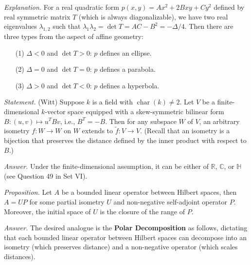 \documentclass{mathproblems}
\newcommand\R{\mathbb{R}}
\newcommand\C{\mathbb{C}}
\begin{document}
\begin{questions}
\textit{Explanation.} For a real quadratic form $p(x,y)=Ax^2+2Bxy+Cy^2$ defined by real symmetric matrix $T$ (which is always diagonalizable), we have two real eigenvalues $\lambda_{1,2}$ such that $\lambda_1\lambda_2=\det T=AC-B^2=-\Delta/4$. Then there are three types from the aspect of affine geometry: \vspace{-6pt}
\begin{itemize}
\item[(1)] $\Delta<0$ and $\det T>0$: $p$ defines an ellipse. \vspace{-4pt}

\item[(2)] $\Delta=0$ and $\det T=0$: $p$ defines a parabola. \vspace{-4pt}

\item[(3)] $\Delta>0$ and $\det T<0$: $p$ defines a hyperbola.
\end{itemize}



\textit{Statement.} (Witt) Suppose $k$ is a field with $\operatorname{char}(k)\neq 2$. Let $V$ be a finite-dimensional $k$-vector space equipped with a skew-symmetric bilinear form $B:(u,v)\mapsto u^T B v$, i.e., $B^T=-B$. Then for any subspace $W$ of $V$, an arbitrary isometry $f:W\to W$ on $W$ extends to $\tilde f:V\to V$. (Recall that an isometry is a bijection that preserves the distance defined by the inner product with respect to $B$.)


\textit{Answer.} Under the finite-dimensional assumption, it can be either of $\R$, $\C$, or $\mathbb{H}$ (see Question 49 in Set VI).


{\color{violet}\textit{Proposition.} Let $A$ be a bounded linear operator between Hilbert spaces, then $A=UP$ for some partial isometry $U$ and non-negative self-adjoint operator $P$. Moreover, the initial space of $U$ is the closure of the range of $P$.}

\textit{Answer.} The desired analogue is the {\color{violet}\textbf{Polar Decomposition}} as follows, dictating that each bounded linear operator between Hilbert spaces can decompose into an isometry (which preserves distance) and a non-negative operator (which scales distances).


\end{questions}
\end{document}

